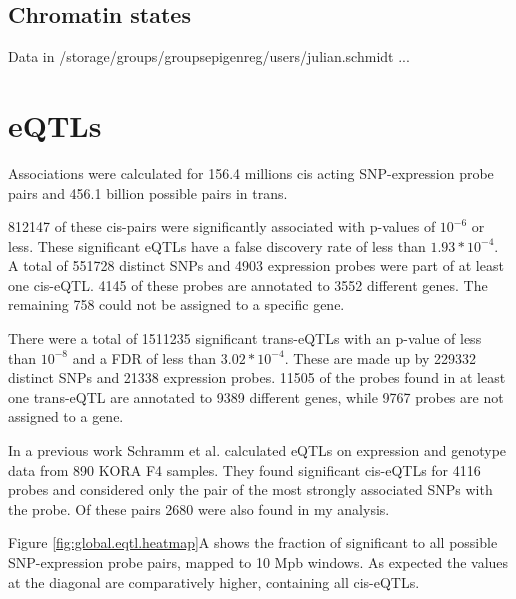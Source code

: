 \documentclass[a4paper,12pt,twoside,openright]{report}
\begin{document}
\subsection{Chromatin states}
Data in /storage/groups/groups\textunderscore epigenreg/users/julian.schmidt ...

\section{eQTLs}
\label{Results:eQTLs}
Associations were calculated for 156.4 millions cis acting SNP-expression probe pairs and 456.1 billion possible pairs in trans. 

812147 of these cis-pairs were significantly associated with p-values of $10^{-6}$ or less. These significant eQTLs have a false discovery rate of less than $1.93*10^{-4}$. A total of 551728 distinct SNPs and 4903 expression probes were part of at least one cis-eQTL. 4145 of these probes are annotated to 3552 different genes. The remaining 
758 could not be assigned to a specific gene.

There were a total of 1511235 significant trans-eQTLs with an p-value of less than $10^{-8}$ and a FDR of less than $3.02*10^{-4}$. These are made up by 229332 distinct SNPs and 21338 expression probes. 11505 of the probes found in at least one trans-eQTL are annotated to 9389 different genes, while 9767 probes are not assigned to a gene.

In a previous work Schramm et al. \cite{10.1371/journal.pone.0093844} calculated eQTLs on expression and genotype data from 890 KORA F4 samples. They found significant cis-eQTLs for 4116 probes and considered only the pair of the most strongly associated SNPs with the probe. Of these pairs 2680 were also found in my analysis. 

Figure \ref{fig:global.eqtl.heatmap}A shows the fraction of significant to all possible  SNP-expression probe pairs, mapped to 10 Mpb windows. As expected the values at the diagonal are comparatively higher, containing all cis-eQTLs. 
\end{document}
